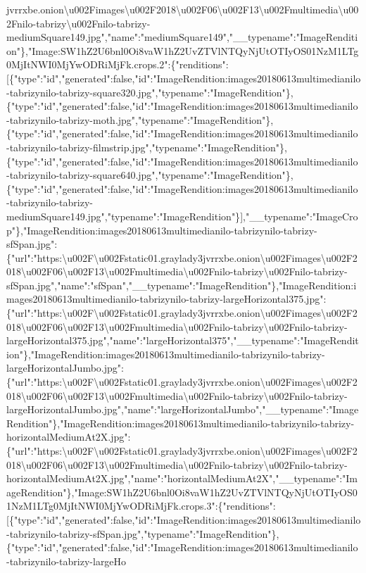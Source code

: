 jvrrxbe.onion\textbackslash{}u002Fimages\textbackslash{}u002F2018\textbackslash{}u002F06\textbackslash{}u002F13\textbackslash{}u002Fmultimedia\textbackslash{}u002Fnilo-tabrizy\textbackslash{}u002Fnilo-tabrizy-mediumSquare149.jpg","name":"mediumSquare149","\_\_typename":"ImageRendition"\},"Image:SW1hZ2U6bnl0Oi8vaW1hZ2UvZTVlNTQyNjUtOTIyOS01NzM1LTg0MjItNWI0MjYwODRiMjFk.crops.2":\{"renditions":{[}\{"type":"id","generated":false,"id":"ImageRendition:images20180613multimedianilo-tabrizynilo-tabrizy-square320.jpg","typename":"ImageRendition"\},\{"type":"id","generated":false,"id":"ImageRendition:images20180613multimedianilo-tabrizynilo-tabrizy-moth.jpg","typename":"ImageRendition"\},\{"type":"id","generated":false,"id":"ImageRendition:images20180613multimedianilo-tabrizynilo-tabrizy-filmstrip.jpg","typename":"ImageRendition"\},\{"type":"id","generated":false,"id":"ImageRendition:images20180613multimedianilo-tabrizynilo-tabrizy-square640.jpg","typename":"ImageRendition"\},\{"type":"id","generated":false,"id":"ImageRendition:images20180613multimedianilo-tabrizynilo-tabrizy-mediumSquare149.jpg","typename":"ImageRendition"\}{]},"\_\_typename":"ImageCrop"\},"ImageRendition:images20180613multimedianilo-tabrizynilo-tabrizy-sfSpan.jpg":\{"url":"https:\textbackslash{}u002F\textbackslash{}u002Fstatic01.graylady3jvrrxbe.onion\textbackslash{}u002Fimages\textbackslash{}u002F2018\textbackslash{}u002F06\textbackslash{}u002F13\textbackslash{}u002Fmultimedia\textbackslash{}u002Fnilo-tabrizy\textbackslash{}u002Fnilo-tabrizy-sfSpan.jpg","name":"sfSpan","\_\_typename":"ImageRendition"\},"ImageRendition:images20180613multimedianilo-tabrizynilo-tabrizy-largeHorizontal375.jpg":\{"url":"https:\textbackslash{}u002F\textbackslash{}u002Fstatic01.graylady3jvrrxbe.onion\textbackslash{}u002Fimages\textbackslash{}u002F2018\textbackslash{}u002F06\textbackslash{}u002F13\textbackslash{}u002Fmultimedia\textbackslash{}u002Fnilo-tabrizy\textbackslash{}u002Fnilo-tabrizy-largeHorizontal375.jpg","name":"largeHorizontal375","\_\_typename":"ImageRendition"\},"ImageRendition:images20180613multimedianilo-tabrizynilo-tabrizy-largeHorizontalJumbo.jpg":\{"url":"https:\textbackslash{}u002F\textbackslash{}u002Fstatic01.graylady3jvrrxbe.onion\textbackslash{}u002Fimages\textbackslash{}u002F2018\textbackslash{}u002F06\textbackslash{}u002F13\textbackslash{}u002Fmultimedia\textbackslash{}u002Fnilo-tabrizy\textbackslash{}u002Fnilo-tabrizy-largeHorizontalJumbo.jpg","name":"largeHorizontalJumbo","\_\_typename":"ImageRendition"\},"ImageRendition:images20180613multimedianilo-tabrizynilo-tabrizy-horizontalMediumAt2X.jpg":\{"url":"https:\textbackslash{}u002F\textbackslash{}u002Fstatic01.graylady3jvrrxbe.onion\textbackslash{}u002Fimages\textbackslash{}u002F2018\textbackslash{}u002F06\textbackslash{}u002F13\textbackslash{}u002Fmultimedia\textbackslash{}u002Fnilo-tabrizy\textbackslash{}u002Fnilo-tabrizy-horizontalMediumAt2X.jpg","name":"horizontalMediumAt2X","\_\_typename":"ImageRendition"\},"Image:SW1hZ2U6bnl0Oi8vaW1hZ2UvZTVlNTQyNjUtOTIyOS01NzM1LTg0MjItNWI0MjYwODRiMjFk.crops.3":\{"renditions":{[}\{"type":"id","generated":false,"id":"ImageRendition:images20180613multimedianilo-tabrizynilo-tabrizy-sfSpan.jpg","typename":"ImageRendition"\},\{"type":"id","generated":false,"id":"ImageRendition:images20180613multimedianilo-tabrizynilo-tabrizy-largeHo